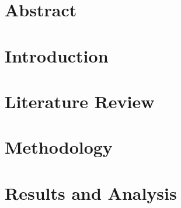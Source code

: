 \documentclass[11pt]{book}
\renewcommand{\baselinestretch}{1.2}
\begin{document}


\newpage
\thispagestyle{empty}
\renewcommand{\thesisdedication}{{\large Copyright \copyright~Ritvik Aryan Kalra, 2024\\}{\large All Rights Reserved\\}}
\thesisdedicationpage


\mastersthesis
%
\chapter*{Abstract}
\label{ch:abstract}

%
\tableofcontents
\listoffigures
\let\cleardoublepage\clearpage
\listoftables
\printglossary[type=\acronymtype,title=Abbreviations,nonumberlist]
\printunsrtglossary[type=symbols]

% 

\chapter{Introduction}
\label{ch:intro}


\chapter{Literature Review}
\label{ch:literature review}



\chapter{Methodology}
\label{ch:methodology}



\chapter{Results and Analysis}
\label{ch:results_and_analysis}

\end{document}
